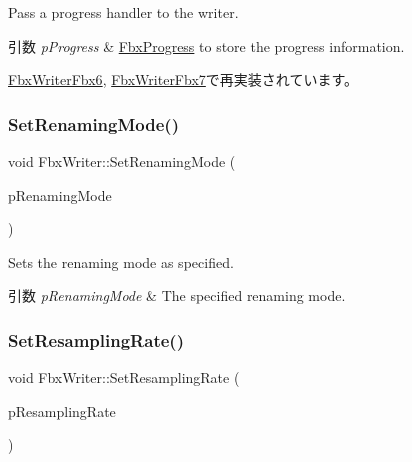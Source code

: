 Pass a progress handler to the writer. 
\begin{DoxyParams}{引数}
{\em p\+Progress} & \hyperlink{class_fbx_progress}{Fbx\+Progress} to store the progress information. \\
\hline
\end{DoxyParams}


\hyperlink{class_fbx_writer_fbx6_a3877fb079da98f7883ec977a5fe206f1}{Fbx\+Writer\+Fbx6}, \hyperlink{class_fbx_writer_fbx7_a80285d709aabb9d36f3f10d95cebf356}{Fbx\+Writer\+Fbx7}で再実装されています。

\mbox{\label{class_fbx_writer_aba927b8b74b98fae0074662a2924a6b0}} 
\subsubsection{\texorpdfstring{Set\+Renaming\+Mode()}{SetRenamingMode()}}
{\footnotesize\ttfamily void Fbx\+Writer\+::\+Set\+Renaming\+Mode (\begin{DoxyParamCaption}\item[{\hyperlink{class_fbx_scene_renamer_a9279ee1a645d6499b934adbc376f8678}{Fbx\+Scene\+Renamer\+::\+E\+Renaming\+Mode}}]{p\+Renaming\+Mode }\end{DoxyParamCaption})}

Sets the renaming mode as specified. 
\begin{DoxyParams}{引数}
{\em p\+Renaming\+Mode} & The specified renaming mode. \\
\hline
\end{DoxyParams}
\mbox{\label{class_fbx_writer_aeed0e237cbed7c5ae6c29aa78932dbe6}} 
\subsubsection{\texorpdfstring{Set\+Resampling\+Rate()}{SetResamplingRate()}}
{\footnotesize\ttfamily void Fbx\+Writer\+::\+Set\+Resampling\+Rate (\begin{DoxyParamCaption}\item[{double}]{p\+Resampling\+Rate }\end{DoxyParamCaption})}

